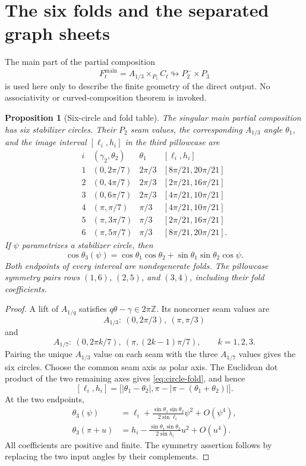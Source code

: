 \documentclass[11pt,reqno]{amsart}
\theoremstyle{plain}
\newtheorem{proposition}[theorem]{Proposition}
\theoremstyle{definition}
\newcommand{\Z}{\mathbb{Z}}
\newcommand{\iss}{\looparrowright}
\begin{document}
\section{The six folds and the separated graph sheets}\label{sec:geometry}

The main part of the partial composition
\[
 F_t^{\mathrm{main}}=A_{1/3}\times_{P_1}C_t\iss P_2^-\times P_3
\]
is used here only to describe the finite geometry of the direct output.  No associativity or
curved-composition theorem is invoked.

\begin{proposition}[Six-circle and fold table]\label{prop:six-fold-table}
The singular main partial composition has six stabilizer circles.  Their $P_2$ seam values, the
corresponding $A_{1/3}$ angle $\theta_1$, and the image interval $[\ell_i,h_i]$ in the third
pillowcase are
\[
\begin{array}{c|c|c|c}
i&(\gamma_2,\theta_2)&\theta_1&[\ell_i,h_i]\\ \hline
1&(0,2\pi/7)&2\pi/3&[8\pi/21,20\pi/21]\\
2&(0,4\pi/7)&2\pi/3&[2\pi/21,16\pi/21]\\
3&(0,6\pi/7)&2\pi/3&[4\pi/21,10\pi/21]\\
4&(\pi,\pi/7)&\pi/3&[4\pi/21,10\pi/21]\\
5&(\pi,3\pi/7)&\pi/3&[2\pi/21,16\pi/21]\\
6&(\pi,5\pi/7)&\pi/3&[8\pi/21,20\pi/21].
\end{array}
\]
If $\psi$ parametrizes a stabilizer circle, then
\begin{equation}\label{eq:circle-fold}
 \cos\theta_3(\psi)
 =\cos\theta_1\cos\theta_2
  +\sin\theta_1\sin\theta_2\cos\psi.
\end{equation}
Both endpoints of every interval are nondegenerate folds.  The pillowcase symmetry pairs rows
$(1,6)$, $(2,5)$, and $(3,4)$, including their fold coefficients.
\end{proposition}

\begin{proof}
A lift of $A_{1/q}$ satisfies $q\theta-\gamma\in2\pi\Z$.  Its noncorner seam values are
\[
 A_{1/3}:\ (0,2\pi/3),\ (\pi,\pi/3)
\]
and
\[
 A_{1/7}:\ (0,2\pi k/7),\ (\pi,(2k-1)\pi/7),
 \qquad k=1,2,3.
\]
Pairing the unique $A_{1/3}$ value on each seam with the three $A_{1/7}$ values gives the six
circles.  Choose the common seam axis as polar axis.  The Euclidean dot product of the two
remaining axes gives \eqref{eq:circle-fold}, and hence
\[
 [\ell_i,h_i]
 =\bigl[|\theta_1-\theta_2|,
         \pi-|\pi-(\theta_1+\theta_2)|\bigr].
\]
At the two endpoints,
\begin{align*}
 \theta_3(\psi)&=\ell_i+
 \frac{\sin\theta_1\sin\theta_2}{2\sin\ell_i}\psi^2+O(\psi^4),\\
 \theta_3(\pi+u)&=h_i-
 \frac{\sin\theta_1\sin\theta_2}{2\sin h_i}u^2+O(u^4).
\end{align*}
All coefficients are positive and finite.  The symmetry assertion follows by replacing the two
input angles by their complements.
\end{proof}
\end{document}
